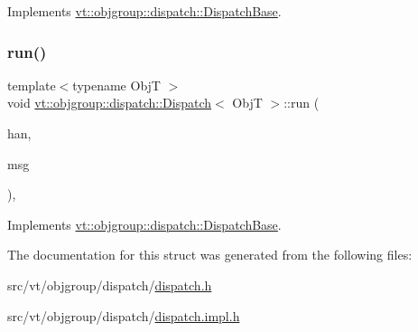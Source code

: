 Implements \hyperlink{structvt_1_1objgroup_1_1dispatch_1_1_dispatch_base_ad0ba1baf3de179f6d6b749aedcd76490}{vt\+::objgroup\+::dispatch\+::\+Dispatch\+Base}.

\mbox{\label{structvt_1_1objgroup_1_1dispatch_1_1_dispatch_a9e6b35e9ff07fcc30c69b37fed60f770}} 
\subsubsection{\texorpdfstring{run()}{run()}}
{\footnotesize\ttfamily template$<$typename ObjT $>$ \\
void \hyperlink{structvt_1_1objgroup_1_1dispatch_1_1_dispatch}{vt\+::objgroup\+::dispatch\+::\+Dispatch}$<$ ObjT $>$\+::run (\begin{DoxyParamCaption}\item[{\hyperlink{namespacevt_af64846b57dfcaf104da3ef6967917573}{Handler\+Type}}]{han,  }\item[{\hyperlink{namespacevt_ac34f95a5e2b8109b55bfba52b074443d}{Base\+Message} $\ast$}]{msg }\end{DoxyParamCaption})\hspace{0.3cm}{\ttfamily [override]}, {\ttfamily [virtual]}}



Implements \hyperlink{structvt_1_1objgroup_1_1dispatch_1_1_dispatch_base_a539a57642138f35e38419e57e9138a2f}{vt\+::objgroup\+::dispatch\+::\+Dispatch\+Base}.



The documentation for this struct was generated from the following files\+:\begin{DoxyCompactItemize}
\item 
src/vt/objgroup/dispatch/\hyperlink{objgroup_2dispatch_2dispatch_8h}{dispatch.\+h}\item 
src/vt/objgroup/dispatch/\hyperlink{objgroup_2dispatch_2dispatch_8impl_8h}{dispatch.\+impl.\+h}\end{DoxyCompactItemize}
